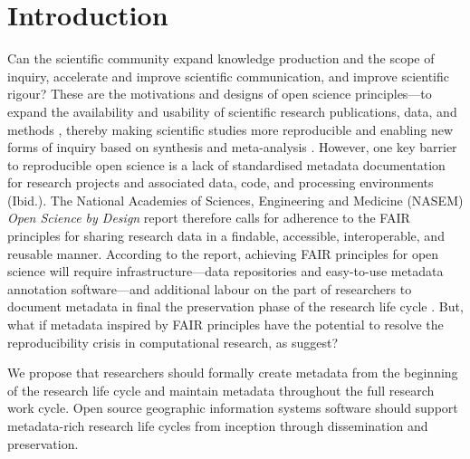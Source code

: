 \documentclass{isprs} %
\begin{document}

\maketitle


\sloppy

\section{Introduction}\label{Introduction}

Can the scientific community expand knowledge production and the scope of inquiry, accelerate and improve scientific communication, and improve scientific rigour?
These are the motivations and designs of open science principles---to expand the availability and usability of scientific research publications, data, and methods \citep{NASEM2018}, thereby making scientific studies more reproducible  and enabling new forms of inquiry based on synthesis and meta-analysis \citep{NASEM2018,NASEM2019}.
However, one key barrier to reproducible open science is a lack of standardised metadata documentation for research projects and associated data, code, and processing environments (Ibid.).
The National Academies of Sciences, Engineering and Medicine (NASEM) \textit{Open Science by Design} \citeyear{NASEM2018} report therefore calls for adherence to the FAIR principles \citep{Wilkinson2016} for sharing research data in a findable, accessible, interoperable, and reusable manner.
According to the report, achieving FAIR principles for open science will require infrastructure---data repositories and easy-to-use metadata annotation software---and additional labour on the part of researchers to document metadata in final the preservation phase of the research life cycle \citep{NASEM2018}. 
But, what if metadata inspired by FAIR principles have the potential to resolve  the reproducibility crisis in computational research, as \citep{Leipzig2021} suggest?

We propose that researchers should formally create metadata from the beginning of the research life cycle and maintain metadata throughout the full research work cycle.
Open source geographic information systems software should support metadata-rich research life cycles from inception through dissemination and preservation.
\end{document}

